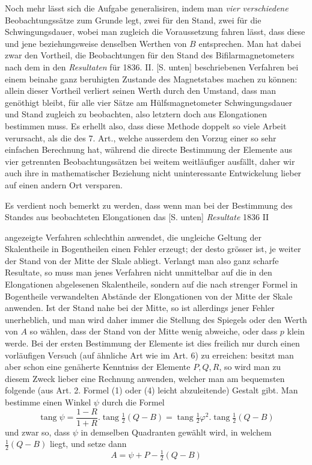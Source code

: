 Noch mehr lässt sich die Aufgabe generalisiren, indem man \textit{vier verschiedene} Beobachtungssätze zum Grunde legt, zwei für den Stand, zwei für die Schwingungsdauer, wobei man zugleich die Voraussetzung fahren lässt, dass diese und jene beziehungsweise denselben Werthen von $B$ entsprechen. Man hat dabei zwar den Vortheil, die Beobachtungen für den Stand des Bifilarmagnetometers nach dem in den \textit{Resultaten} für 1836. II. [S. unten] beschriebenen Verfahren bei einem beinahe ganz beruhigten Zustande des Magnetstabes machen zu können: allein dieser Vortheil verliert seinen Werth durch den Umstand, dass man genöthigt bleibt, für alle vier Sätze am Hülfsmagnetometer Schwingungsdauer und Stand zugleich zu beobachten, also letztern doch aus Elongationen bestimmen muss. Es erhellt also, dass diese Methode doppelt so viele Arbeit verursacht, als die des 7. Art., welche ausserdem den Vorzug einer so sehr einfachen Berechnung hat, während die directe Bestimmung der Elemente aus vier getrennten Beobachtungssätzen bei weitem weitläufiger ausfällt, daher wir auch ihre in mathematischer Beziehung nicht uninteressante Entwickelung lieber auf einen andern Ort versparen.

Es verdient noch bemerkt zu werden, dass wenn man bei der Bestimmung des Standes aus beobachteten Elongationen das [S. unten] \textit{Resultate} 1836 II
\par\clearpage
{}
\noindent angezeigte Verfahren schlechthin anwendet, die ungleiche Geltung der Skalentheile in Bogentheilen einen Fehler erzeugt; der desto grösser ist, je weiter der Stand von der Mitte der Skale abliegt. Verlangt man also ganz scharfe Resultate, so muss man jenes Verfahren nicht unmittelbar auf die in den Elongationen abgelesenen Skalentheile, sondern auf die nach strenger Formel in Bogentheile verwandelten Abstände der Elongationen von der Mitte der Skale anwenden. Ist der Stand nahe bei der Mitte, so ist allerdings jener Fehler unerheblich, und man wird daher immer die Stellung des Spiegels oder den Werth von $A$ so wählen, dass der Stand von der Mitte wenig abweiche, oder dass $p$ klein werde. Bei der ersten Bestimmung der Elemente ist dies freilich nur durch einen vorläufigen Versuch (auf ähnliche Art wie im Art. 6) zu erreichen: besitzt man aber schon eine genäherte Kenntniss der Elemente $P,Q,R$, so wird man zu diesem Zweck lieber eine Rechnung anwenden, welcher man am bequemsten folgende (aus Art. 2. Formel (1) oder (4) leicht abzuleitende) Gestalt gibt. Man bestimme einen Winkel $\psi$ durch die Formel
\[
\operatorname{tang}\psi=\frac{1-R}{1+R}.\operatorname{tang}\tfrac12(Q-B)=\operatorname{tang}\tfrac12\varphi^2.\operatorname{tang}\tfrac12(Q-B)
\]
und zwar so, dass $\psi$ in demselben Quadranten gewählt wird, in welchem $\tfrac12(Q-B)$ liegt, und setze dann
\[
A=\psi+P-\tfrac12(Q-B)
\]

